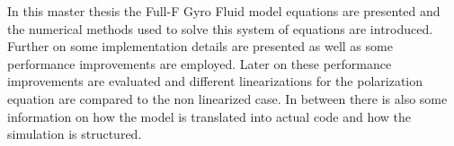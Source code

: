 \documentclass[master.tex]{subfiles}
\begin{document}
In this master thesis the Full-F Gyro Fluid model equations are presented and the numerical methods used to solve this system of equations are introduced. Further on some implementation details are presented as well as some performance improvements are employed. Later on these performance improvements are evaluated and different linearizations for the polarization equation are compared to the non linearized case.\newline
{}In between there is also some information on how the model is translated into actual code and how the simulation is structured.
\end{document}
